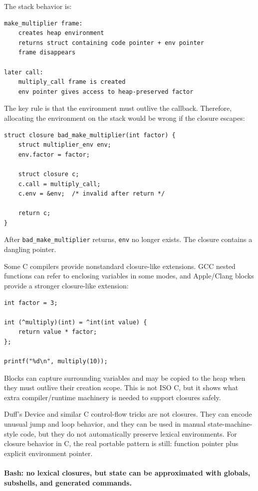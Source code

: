 The stack behavior is:

\begin{verbatim}
make_multiplier frame:
    creates heap environment
    returns struct containing code pointer + env pointer
    frame disappears

later call:
    multiply_call frame is created
    env pointer gives access to heap-preserved factor
\end{verbatim}

The key rule is that the environment must outlive the callback. Therefore, allocating the environment on the stack would be wrong if the closure escapes:

\begin{verbatim}
struct closure bad_make_multiplier(int factor) {
    struct multiplier_env env;
    env.factor = factor;

    struct closure c;
    c.call = multiply_call;
    c.env = &env;  /* invalid after return */

    return c;
}
\end{verbatim}

After \texttt{bad\_make\_multiplier} returns, \texttt{env} no longer exists. The closure contains a dangling pointer.

Some C compilers provide nonstandard closure-like extensions. GCC nested functions can refer to enclosing variables in some modes, and Apple/Clang blocks provide a stronger closure-like extension:

\begin{verbatim}
int factor = 3;

int (^multiply)(int) = ^int(int value) {
    return value * factor;
};

printf("%d\n", multiply(10));
\end{verbatim}

Blocks can capture surrounding variables and may be copied to the heap when they must outlive their creation scope. This is not ISO C, but it shows what extra compiler/runtime machinery is needed to support closures safely.

Duff's Device and similar C control-flow tricks are not closures. They can encode unusual jump and loop behavior, and they can be used in manual state-machine-style code, but they do not automatically preserve lexical environments. For closure behavior in C, the real portable pattern is still: function pointer plus explicit environment pointer.

\paragraph{Bash: no lexical closures, but state can be approximated with globals, subshells, and generated commands.}

